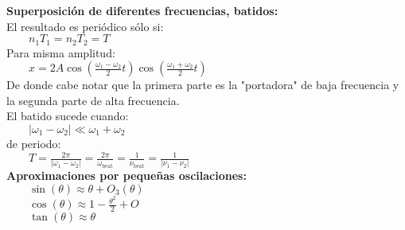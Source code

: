 \documentclass[a4paper,landscape,10pt]{cheatsheet}
\begin{document}
\textbf{Superposición de diferentes frecuencias, batidos:}\\
El resultado es periódico sólo si:\\
$\qquad n_1T_1=n_2T_2=T$\\
Para misma amplitud:\\
$\qquad x=2A \cos\left(\frac{\omega_1-\omega_2}{2}t\right) \cos\left(\frac{\omega_1+\omega_2}{2}t\right)$\\
De donde cabe notar que la primera parte es la "portadora" de baja frecuencia y la segunda parte de alta frecuencia.\\
El batido sucede cuando:\\
$\qquad\lvert\omega_1-\omega_2\rvert\ll\omega_1+\omega_2$\\
de periodo:\\
$\qquad T=\frac{2\pi}{\lvert\omega_1-\omega_2\lvert}=\frac{2\pi}{\omega_{\text{beat}}}=\frac{1}{\nu_{\text{beat}}}=\frac{1}{\lvert \nu_1-\nu_2\rvert}$
\\

\textbf{Aproximaciones por pequeñas oscilaciones:}\\
$\qquad \sin(\theta)\approx\theta + O_3(\theta)$\\
$\qquad \cos(\theta)\approx1 - \frac{\theta^2}{2} + O$\\
$\qquad \tan(\theta)\approx\theta$\\
\end{document}
